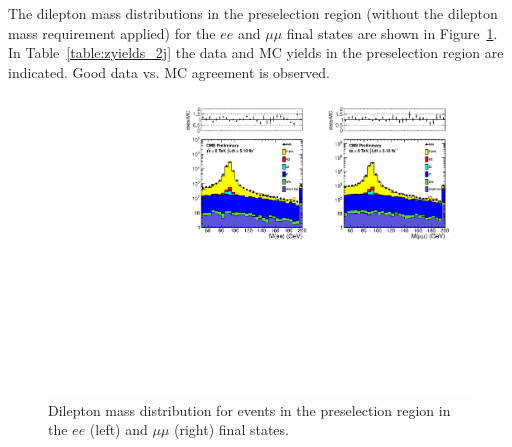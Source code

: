 The dilepton mass distributions in the preselection region (without the dilepton mass requirement applied) for the $ee$ and $\mu\mu$ 
final states are shown in Figure~\ref{fig:dilmass_2j}. In Table~\ref{table:zyields_2j} the data and MC yields in the preselection
region are indicated. Good data vs. MC agreement is observed.


\begin{figure}[hbt]
  \begin{center}
	\includegraphics[width=1.0\linewidth]{plots/dilmass_ee_mm_2j.pdf}
	\caption{
	  \label{fig:dilmass_2j}\protect 
	  Dilepton mass distribution for events in the preselection region
	  in the $ee$ (left) and $\mu\mu$ (right) final states.}
  \end{center}
\end{figure}

